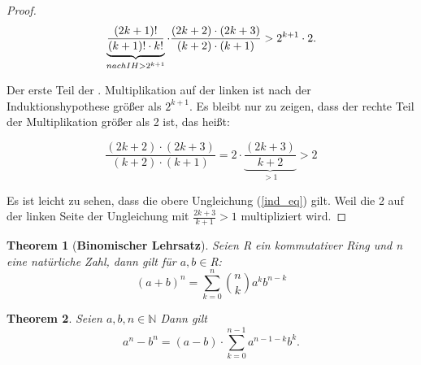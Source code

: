 \documentclass[12pt,oneside]{article}
\newtheorem{theorem}{Theorem}[section]
\theoremstyle{remark}
\theoremstyle{definition}
\begin{document}
\begin{flushleft}
\begin{flushleft}
\begin{proof}
\begin{equation}
     \underbrace{\frac{(2k + 1)!}{(k + 1)! \cdot k!}}_{nach IH > 2^{k + 1}} \cdot \frac{(2k + 2) \cdot (2k + 3)}{(k + 2) \cdot (k + 1)} > 2^{k+1} \cdot 2.\newline\newline
\end{equation}

Der erste Teil der . Multiplikation auf der linken ist nach der Induktionshypothese größer als $2^{k+1}$. Es bleibt nur zu zeigen, dass der rechte Teil der Multiplikation größer als 2 ist, das heißt: \newline\newline

\begin{equation}\label{ind_eq}
\frac{(2k + 2) \cdot (2k + 3)}{(k + 2) \cdot (k + 1)} = 2 \cdot \underbrace{\frac{(2k + 3 )}{k + 2}}_{ > 1} > 2
\end{equation}

Es ist leicht zu sehen, dass die obere Ungleichung (\ref{ind_eq}) gilt. Weil die 2 auf der linken Seite der Ungleichung mit $\frac{2k + 3}{k + 1} > 1$ multipliziert wird.


\end{proof}

\end{flushleft}
\smallskip 

\begin{theorem}[\textbf{Binomischer Lehrsatz}]\label{Th_3}
Seien R ein kommutativer Ring und n eine natürliche Zahl, dann gilt für $a,b \in $R:\newline\newline
 \begin{equation}
     (a + b)^n  = \sum_{k=0}^n {n \choose k} a^k b^{n-k}
 \end{equation}
\end{theorem}

\smallskip

\begin{theorem}\label{funny_id}
Seien $a,b,n \in \mathbb{N}$ Dann gilt\newline\newline \begin{equation}
    a^{n} - b^n = (a - b) \cdot \sum_{k = 0}^{n - 1} a^{n -1 - k} b^k.
\end{equation}
\end{theorem}

\end{flushleft}
\end{document}
